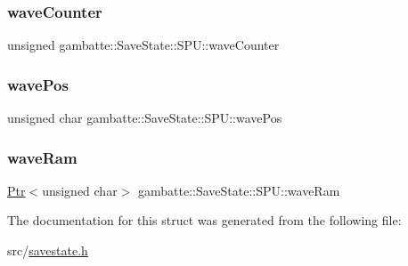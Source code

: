 \subsubsection{\texorpdfstring{wave\+Counter}{waveCounter}}
{\footnotesize\ttfamily unsigned gambatte\+::\+Save\+State\+::\+S\+P\+U\+::wave\+Counter}

\mbox{\label{structgambatte_1_1SaveState_1_1SPU_a34262510738618c8969cf29fa20808f2}} 
\subsubsection{\texorpdfstring{wave\+Pos}{wavePos}}
{\footnotesize\ttfamily unsigned char gambatte\+::\+Save\+State\+::\+S\+P\+U\+::wave\+Pos}

\mbox{\label{structgambatte_1_1SaveState_1_1SPU_af385ccd5872ee4a92752e9017b797402}} 
\subsubsection{\texorpdfstring{wave\+Ram}{waveRam}}
{\footnotesize\ttfamily \hyperlink{classgambatte_1_1SaveState_1_1Ptr}{Ptr}$<$unsigned char$>$ gambatte\+::\+Save\+State\+::\+S\+P\+U\+::wave\+Ram}



The documentation for this struct was generated from the following file\+:\begin{DoxyCompactItemize}
\item 
src/\hyperlink{savestate_8h}{savestate.\+h}\end{DoxyCompactItemize}

